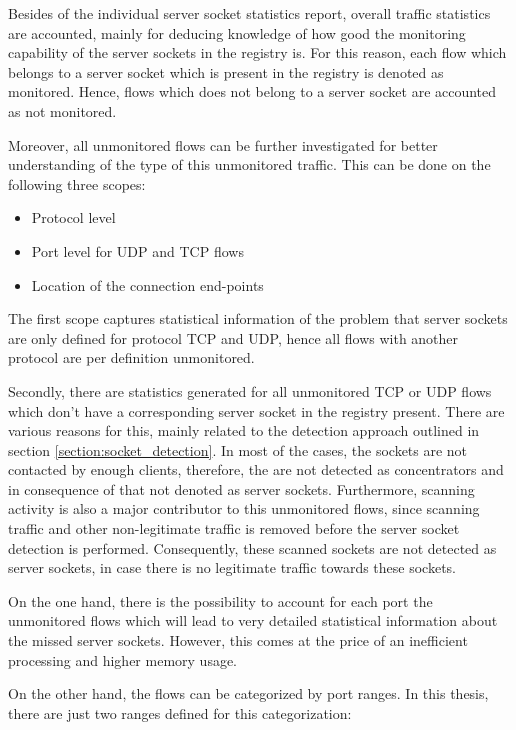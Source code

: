 Besides of the individual server socket statistics report, overall traffic statistics are accounted, mainly for deducing knowledge of how good the monitoring capability of the server sockets in the registry is. For this reason, each flow which belongs to a server socket which is present in the registry is denoted as monitored. Hence, flows which does not belong to a server socket are accounted as not monitored. 

Moreover, all unmonitored flows can be further investigated for better understanding of the type of this unmonitored traffic. This can be done on the following three scopes: 
\begin{itemize}
	\item Protocol level 
	\item Port level for \gls{UDP} and \gls{TCP} flows 
	\item Location of the connection end-points 
\end{itemize}

The first scope captures statistical information of the problem that server sockets are only defined for protocol \gls{TCP} and \gls{UDP}, hence all flows with another protocol are per definition unmonitored.

Secondly, there are statistics generated for all unmonitored \gls{TCP} or \gls{UDP} flows which don't have a corresponding server socket in the registry present. There are various reasons for this, mainly related to the detection approach outlined in section \ref{section:socket_detection}. In most of the cases, the sockets are not contacted by enough clients, therefore, the are not detected as concentrators and in consequence of that not denoted as server sockets. Furthermore, scanning activity is also a major contributor to this unmonitored flows, since scanning traffic and other non-legitimate traffic is removed before the server socket detection is performed. Consequently, these scanned sockets are not detected as server sockets, in case there is no legitimate traffic towards these sockets.

On the one hand, there is the possibility to account for each port the unmonitored flows which will lead to very detailed statistical information about the missed server sockets. However, this comes at the price of an inefficient processing and higher memory usage. 

On the other hand, the flows can be categorized by port ranges. In this thesis, there are just two ranges defined for this categorization:

